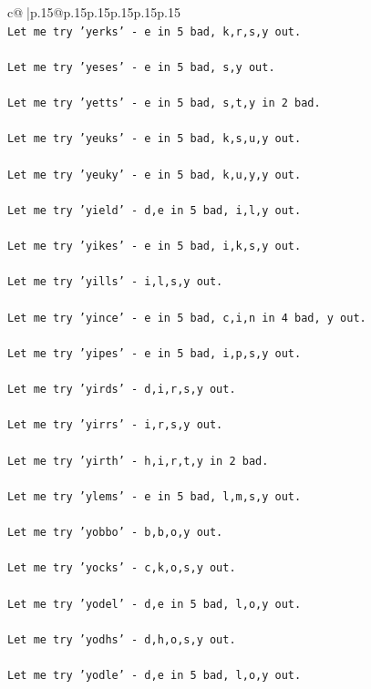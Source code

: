 \documentclass{article}
\begin{document}
{\begin{supertabular}{c@{$\;$}|p{.15\linewidth}@{}p{.15\linewidth}p{.15\linewidth}p{.15\linewidth}p{.15\linewidth}p{.15\linewidth}}
{{{\\ 
\texttt{Let me try 'yerks' {-} e in 5 bad, k,r,s,y out. } \\
\\ 
\texttt{Let me try 'yeses' {-} e in 5 bad, s,y out. } \\
\\ 
\texttt{Let me try 'yetts' {-} e in 5 bad, s,t,y in 2 bad. } \\
\\ 
\texttt{Let me try 'yeuks' {-} e in 5 bad, k,s,u,y out. } \\
\\ 
\texttt{Let me try 'yeuky' {-} e in 5 bad, k,u,y,y out. } \\
\\ 
\texttt{Let me try 'yield' {-} d,e in 5 bad, i,l,y out. } \\
\\ 
\texttt{Let me try 'yikes' {-} e in 5 bad, i,k,s,y out. } \\
\\ 
\texttt{Let me try 'yills' {-} i,l,s,y out. } \\
\\ 
\texttt{Let me try 'yince' {-} e in 5 bad, c,i,n in 4 bad, y out. } \\
\\ 
\texttt{Let me try 'yipes' {-} e in 5 bad, i,p,s,y out. } \\
\\ 
\texttt{Let me try 'yirds' {-} d,i,r,s,y out. } \\
\\ 
\texttt{Let me try 'yirrs' {-} i,r,s,y out. } \\
\\ 
\texttt{Let me try 'yirth' {-} h,i,r,t,y in 2 bad. } \\
\\ 
\texttt{Let me try 'ylems' {-} e in 5 bad, l,m,s,y out. } \\
\\ 
\texttt{Let me try 'yobbo' {-} b,b,o,y out. } \\
\\ 
\texttt{Let me try 'yocks' {-} c,k,o,s,y out. } \\
\\ 
\texttt{Let me try 'yodel' {-} d,e in 5 bad, l,o,y out. } \\
\\ 
\texttt{Let me try 'yodhs' {-} d,h,o,s,y out. } \\
\\ 
\texttt{Let me try 'yodle' {-} d,e in 5 bad, l,o,y out. } \\
}}}
\end{supertabular}}
\end{document}
